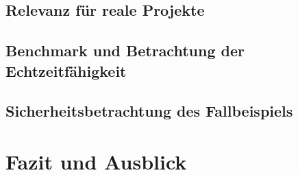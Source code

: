 \documentclass[
  a4paper,					    %
  twoside,
  DIV=calc,     				%
  bibliography=totoc,
  cleardoublepage=empty,
  ngerman,     					%
  final       					%
]{scrbook}
\begin{document}
\section{Relevanz für reale Projekte}
\label{sec:Relevanz}
% 



% 
\section{Benchmark und Betrachtung der Echtzeitfähigkeit}
\label{sec:Benchmark}
%
%






\section{Sicherheitsbetrachtung des Fallbeispiels}
\label{sec:Sicherheit_Beispiel}











\chapter{Fazit und Ausblick}
\label{sec:FazitAusblick}
\end{document}

